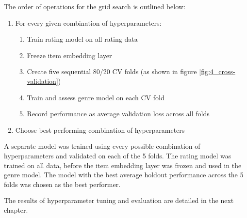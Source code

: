 The order of operations for the grid search is outlined below:

\begin{enumerate}
  \item For every given combination of hyperparameters:
  \begin{enumerate}
    \item Train rating model on all rating data
    \item Freeze item embedding layer
    \item Create five sequential 80/20 CV folds (as shown in figure \ref{fig:4_cross-validation})
    \item Train and assess genre model on each CV fold
    \item Record performance as average validation loss across all folds
  \end{enumerate}
  \item Choose best performing combination of hyperparameters
\end{enumerate}

A separate model was trained using every possible combination of hyperparameters and validated on each of the 5 folds. The rating model was trained on all data, before the item embedding layer was frozen and used in the genre model. The model with the best average holdout performance across the 5 folds was chosen as the best performer.

The results of hyperparameter tuning and evaluation are detailed in the next chapter.